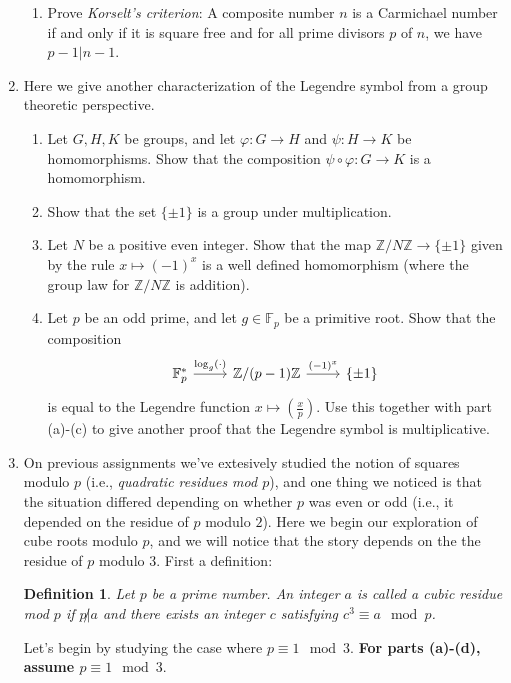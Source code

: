 \documentclass[11pt]{article}
\newtheorem{definition}{Definition}
\newcommand{\bF}{\mathbb{F}}
\newcommand{\bZ}{\mathbb{Z}}
\begin{document}
\begin{enumerate}
{\begin{enumerate}
{    }
    \item{
    Prove \textit{Korselt's criterion}: A composite number $n$ is a Carmichael number if and only if it is square free and for all prime divisors $p$ of $n$, we have $p-1|n-1$.
    }
  \end{enumerate}
  }
  \item{
  Here we give another characterization of the Legendre symbol from a group theoretic perspective.
  \begin{enumerate}
    \item{
    Let $G,H,K$ be groups, and let $\varphi:G\to H$ and $\psi:H\to K$ be homomorphisms.  Show that the composition $\psi\circ\varphi:G\to K$ is a homomorphism.
    }
    \item{
    Show that the set $\{\pm1\}$ is a group under multiplication.
    }
    \item{
    Let $N$ be a positive even integer.  Show that the map $\bZ/N\bZ\to\{\pm1\}$ given by the rule $x\mapsto (-1)^x$ is a well defined homomorphism (where the group law for $\bZ/N\bZ$ is addition).
    }
    \item{
    Let $p$ be an odd prime, and let $g\in\bF_p$ be a primitive root.  Show that the composition
    \[
    \begin{tikzcd}
      \bF_p^*\ar[r,"\log_g(\cdot)"]&\bZ/(p-1)\bZ\ar[r,"(-1)^x"]&\{\pm1\}
    \end{tikzcd}
    \]
    is equal to the Legendre function $x\mapsto\left(\frac{x}{p}\right)$.  Use this together with part (a)-(c) to give another proof that the Legendre symbol is multiplicative.
    }
  \end{enumerate}
  }
  \item{
  On previous assignments we've extesively studied the notion of squares modulo $p$ (i.e., \textit{quadratic residues mod $p$}), and one thing we noticed is that the situation differed depending on whether $p$ was even or odd (i.e., it depended on the residue of $p$ modulo $2$).  Here we begin our exploration of cube roots modulo $p$, and we will notice that the story depends on the the residue of $p$ modulo 3.  First a definition:
  \begin{definition}
    Let $p$ be a prime number.  An integer $a$ is called a \textit{cubic residue mod $p$} if $p\not|a$ and there exists an integer $c$ satisfying $c^3\equiv a\mod p$.
  \end{definition}
  Let's begin by studying the case where $p\equiv 1\mod 3$.  \textbf{For parts (a)-(d), assume $p\equiv1\mod 3$}.
  \begin{enumerate}

\end{enumerate}}
\end{enumerate}
\end{document}
